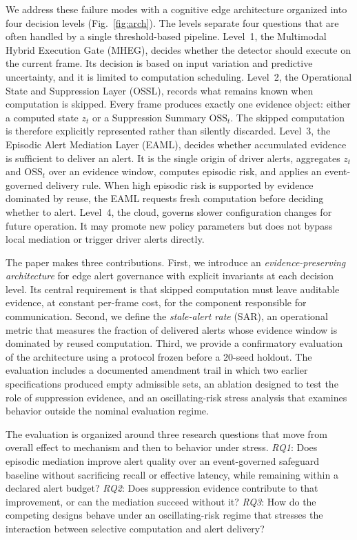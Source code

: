 \documentclass[conference]{IEEEtran}
\newcommand{\osst}{\mathrm{OSS}_t}
\begin{document}
We address these failure modes with a cognitive edge architecture
organized into four decision levels (Fig.~\ref{fig:arch}). The levels
separate four questions that are often handled by a single
threshold-based pipeline. Level~1, the Multimodal Hybrid Execution Gate
(MHEG), decides whether the detector should execute on the current
frame. Its decision is based on input variation and predictive
uncertainty, and it is limited to computation scheduling. Level~2, the
Operational State and Suppression Layer (OSSL), records what remains
known when computation is skipped. Every frame produces exactly one
evidence object: either a computed state $z_t$ or a Suppression Summary
$\osst$. The skipped computation is therefore explicitly represented
rather than silently discarded. Level~3, the Episodic Alert Mediation
Layer (EAML), decides whether accumulated evidence is sufficient to
deliver an alert. It is the single origin of driver alerts, aggregates
$z_t$ and $\osst$ over an evidence window, computes episodic risk, and
applies an event-governed delivery rule. When high episodic risk is
supported by evidence dominated by reuse, the EAML requests fresh
computation before deciding whether to alert. Level~4, the cloud,
governs slower configuration changes for future operation. It may
promote new policy parameters but does not bypass local mediation or
trigger driver alerts directly.

The paper makes three contributions. First, we introduce an
\emph{evidence-preserving architecture} for edge alert governance with
explicit invariants at each decision level. Its central requirement is
that skipped computation must leave auditable evidence, at constant
per-frame cost, for the component responsible for communication.
Second, we define the \emph{stale-alert rate} (SAR), an operational
metric that measures the fraction of delivered alerts whose evidence
window is dominated by reused computation. Third, we provide a
confirmatory evaluation of the architecture using a protocol frozen
before a 20-seed holdout. The evaluation includes a documented amendment
trail in which two earlier specifications produced empty admissible
sets, an ablation designed to test the role of suppression evidence, and
an oscillating-risk stress analysis that examines behavior outside the
nominal evaluation regime.

The evaluation is organized around three research questions that move
from overall effect to mechanism and then to behavior under stress.
\emph{RQ1}: Does episodic mediation improve alert quality over an
event-governed safeguard baseline without sacrificing recall or
effective latency, while remaining within a declared alert budget?
\emph{RQ2}: Does suppression evidence contribute to that improvement, or can the mediation succeed without it?
\emph{RQ3}: How do the competing designs behave under an
oscillating-risk regime that stresses the interaction between selective
computation and alert delivery?
\end{document}
